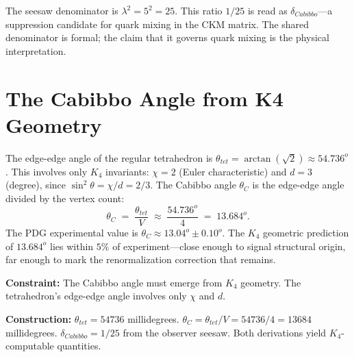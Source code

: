 \documentclass[11pt,a4paper]{book}
\def\circ{o}%
\def\text#1{#1}%
\def\texorpdfstring#1#2{#2}%
\begin{document}
The seesaw denominator is $\lambda^2 = 5^2 = 25$.  This ratio $1/25$
is read as $\delta_{\text{Cabibbo}}$---a suppression candidate for quark
mixing in the CKM matrix.  The shared denominator is formal; the claim that it
governs quark mixing is the physical interpretation.


\section{The Cabibbo Angle from \texorpdfstring{$K_4$}{K4} Geometry}

The edge-edge angle of the regular tetrahedron is
$\theta_{\text{tet}} = \arctan() ^\circ$.  This
involves only $K_4$ invariants: $\chi = 2$ (Euler characteristic) and
$d = 3$ (degree), since $\sin^2\theta = \chi/d = 2/3$.  The Cabibbo
angle $\theta_C$ is the edge-edge angle divided by the vertex count:
\[
\theta_C \;=\; \frac{\theta_{\text{tet}}}{V} \;\approx\;
\frac{54.736^\circ}{4} \;=\; 13.684^\circ.
\]
The PDG experimental value is $\theta_C ^\circ {}^\circ$.
The $K_4$ geometric prediction of $13.684^\circ$ lies within $5\%$ of
experiment---close enough to signal structural origin, far enough to
mark the renormalization correction that remains.

\textbf{Constraint:}
The Cabibbo angle must emerge from $K_4$ geometry.  The tetrahedron's
edge-edge angle involves only $\chi$ and $d$.

\textbf{Construction:}
$\theta_{\text{tet}} = 54736$ millidegrees.
$\theta_C = \theta_{\text{tet}} / V = 54736 / 4 = 13684$ millidegrees.
$\delta_{\text{Cabibbo}} = 1/25$ from the observer seesaw.  Both
derivations yield $K_4$-computable quantities.
\end{document}
